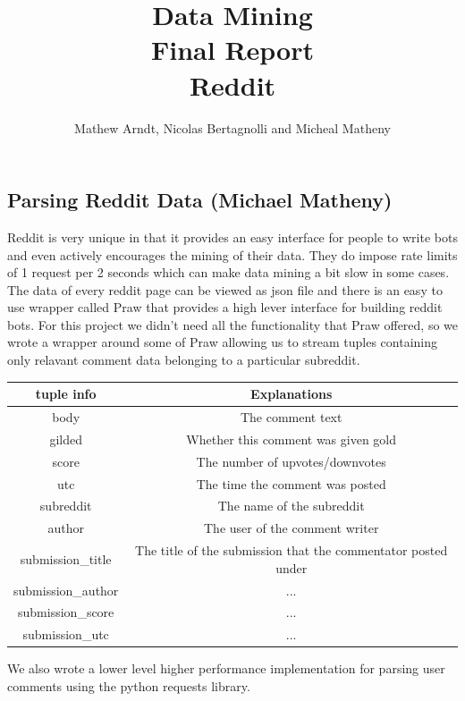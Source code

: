 \documentclass[12pt]{article}
\numberwithin{equation}{section}
\begin{document}
\title{Data Mining \\ Final Report \\ Reddit }
\author{Mathew Arndt, Nicolas Bertagnolli and Micheal Matheny}

\newpage
  
\subsection*{Parsing Reddit Data (Michael Matheny)}
Reddit is very unique in that it provides an easy interface for people to write bots and even actively encourages
the mining of their data. They do impose rate limits of 1 request per 2 seconds which can make data mining a bit slow
in some cases. The data of every reddit page can be viewed as json file and there is an easy to use wrapper called Praw
that provides a high lever interface for building reddit bots. 
For this project we didn't need all the functionality that Praw offered, so we wrote a wrapper around some of Praw
allowing us to stream tuples containing only relavant comment data belonging to a particular subreddit. 

\begin{tabular}{|c|c|}
	\hline tuple info & Explanations \\
	\hline body &    The comment text \\ 
	\hline gilded &  Whether this comment was given gold \\ 
	\hline score &   The number of upvotes/downvotes \\ 
	\hline utc &     The time the comment was posted \\ 
	\hline subreddit &  The name of the subreddit \\ 
	\hline author &  The user of the comment writer\\ 
	\hline submission\_title &  The title of the submission that the commentator posted under  \\ 
	\hline submission\_author &  ... \\ 
	\hline submission\_score &  ...\\ 
	\hline submission\_utc &  ...\\ 
	\hline 
\end{tabular} 

We also wrote a lower level higher performance implementation for parsing user comments using the python requests 
library. 
\end{document}
